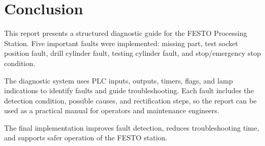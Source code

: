 \section{Conclusion}

This report presents a structured diagnostic guide for the FESTO Processing Station. Five important faults were implemented: missing part, test socket position fault, drill cylinder fault, testing cylinder fault, and stop/emergency stop condition.

The diagnostic system uses PLC inputs, outputs, timers, flags, and lamp indications to identify faults and guide troubleshooting. Each fault includes the detection condition, possible causes, and rectification steps, so the report can be used as a practical manual for operators and maintenance engineers.

The final implementation improves fault detection, reduces troubleshooting time, and supports safer operation of the FESTO station.
